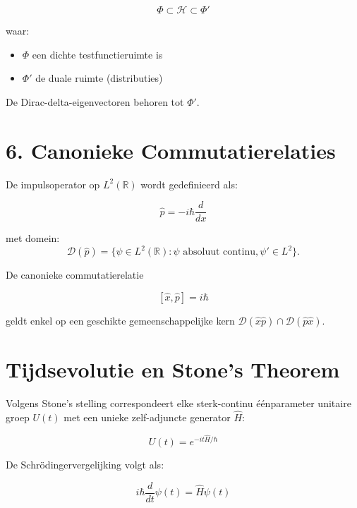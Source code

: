 \documentclass{report} %
\begin{document}
    \[
        \Phi \subset \mathcal{H} \subset \Phi'
    \]

    waar:

    \begin{itemize}
        \item $\Phi$ een dichte testfunctieruimte is
        \item $\Phi'$ de duale ruimte (distributies)
    \end{itemize}

    De Dirac-delta-eigenvectoren behoren tot $\Phi'$.


    \section*{6. Canonieke Commutatierelaties}

    De impulsoperator op $L^2(\mathbb{R})$ wordt gedefinieerd als:

    \begin{equation}
        \hat{p} = -i\hbar \frac{d}{dx}
    \end{equation}

    met domein:
    \[
        \mathcal{D}(\hat{p})
        =
        \{ \psi \in L^2(\mathbb{R}) :
        \psi \text{ absoluut continu},
        \psi' \in L^2 \}.
    \]

    De canonieke commutatierelatie

    \[
        [\hat{x},\hat{p}] = i\hbar
    \]

    geldt enkel op een geschikte gemeenschappelijke kern
    $\mathcal{D}(\hat{x}\hat{p}) \cap
    \mathcal{D}(\hat{p}\hat{x})$.


    \section{Tijdsevolutie en Stone's Theorem}

    Volgens Stone’s stelling correspondeert elke sterk-continu
    éénparameter unitaire groep $U(t)$ met een unieke zelf-adjuncte
    generator $\hat{H}$:

    \begin{equation}
        U(t) = e^{-it\hat{H}/\hbar}
    \end{equation}

    De Schrödingervergelijking volgt als:

    \begin{equation}
        i\hbar \frac{d}{dt} \psi(t)
        =
        \hat{H}\psi(t)
    \end{equation}
\end{document}
